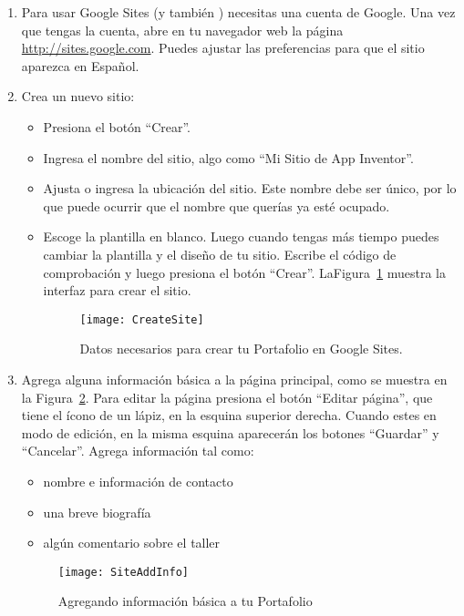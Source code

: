 \begin{enumerate}

\item Para usar Google Sites (y también \AppInventor) necesitas una cuenta de Google. Una vez que tengas la cuenta, abre en tu navegador web la página \url{http://sites.google.com}. Puedes ajustar las preferencias para que el sitio aparezca en Español.

\item Crea un nuevo sitio:

  \begin{itemize}
  \item Presiona el botón ``Crear''.
  \item Ingresa el nombre del sitio, algo como ``Mi Sitio de App Inventor''.
  \item Ajusta o ingresa la ubicación del sitio. Este nombre debe ser único, por lo que puede ocurrir que el nombre que querías ya esté ocupado. 
  \item Escoge la plantilla en blanco. Luego cuando tengas más tiempo puedes cambiar la plantilla y el diseño de tu sitio. Escribe el código de comprobación y luego presiona el botón ``Crear''. LaFigura~\ref{fig:createSite} muestra la interfaz para crear el sitio.

    \begin{figure}[H]
      \centering
      \texttt{[image: CreateSite]}
      \caption{Datos necesarios para crear tu Portafolio en Google Sites.}
      \label{fig:createSite}
    \end{figure}
    
  \end{itemize}

\item Agrega alguna información básica a la página principal, como se muestra en la Figura~\ref{fig:SiteAddInfo}. Para editar la página presiona el botón ``Editar página'', que tiene el ícono de un lápiz, en la esquina superior derecha. Cuando estes en modo de edición, en la misma esquina aparecerán los botones ``Guardar'' y ``Cancelar''. Agrega información tal como:

  \begin{itemize}
  \item nombre e información de contacto
  \item una breve biografía
  \item algún comentario sobre el taller
  \end{itemize}

  \begin{figure}[H]
    \centering
    \texttt{[image: SiteAddInfo]}
    \caption{Agregando información básica a tu Portafolio}
    \label{fig:SiteAddInfo}
  \end{figure}


\end{enumerate}
